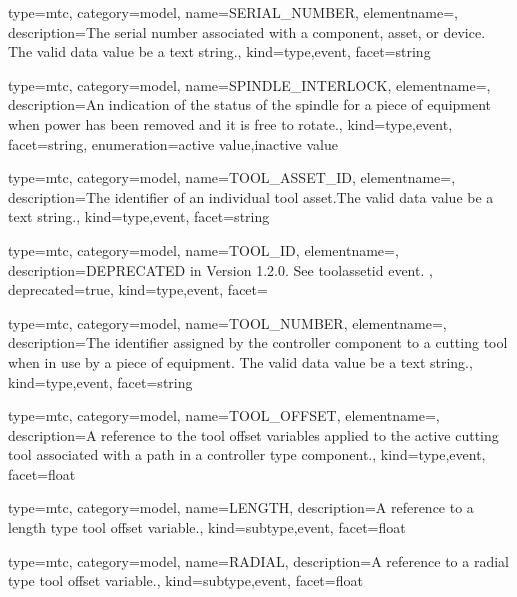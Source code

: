 {
  type=mtc,
  category=model,
  name={SERIAL\_NUMBER},
  elementname=,
  description={The serial number associated with a \gls{component}, \gls{asset}, or \gls{device}. The \gls{valid data value} \must be a text string.},
  kind={type,event},
  facet={\gls{string}}
}


{
  type=mtc,
  category=model,
  name={SPINDLE\_INTERLOCK},
  elementname=,
  description={An indication of the status of the spindle for a piece of equipment when power has been removed and it is free to rotate.},
  kind={type,event},
  facet={\gls{string}},
  enumeration={\gls{active value},\gls{inactive value}}
}


{
  type=mtc,
  category=model,
  name={TOOL\_ASSET\_ID},
  elementname=,
  description={The identifier of an individual tool asset.The \gls{valid data value} \must be a text string.},
  kind={type,event},
  facet={\gls{string}}
}


{
  type=mtc,
  category=model,
  name={TOOL\_ID},
  elementname=,
  description={DEPRECATED in Version 1.2.0.   See \gls{toolassetid event}. },
  deprecated={true},
  kind={type,event},
  facet={}
}


{
  type=mtc,
  category=model,
  name={TOOL\_NUMBER},
  elementname=,
  description={The identifier assigned by the \gls{controller} component to a cutting tool when in use by a piece of equipment. \newline The \gls{valid data value} \must be a text string.},
  kind={type,event},
  facet={\gls{string}}
}


{
  type=mtc,
  category=model,
  name={TOOL\_OFFSET},
  elementname=,
  description={A reference to the tool offset variables applied to the active cutting tool associated with a \gls{path} in a \gls{controller} type component.},
  kind={type,event},
  facet={\gls{float}}
}


{
  type=mtc,
  category=model,
  name={LENGTH},
  description={A reference to a length type tool offset variable.},
  kind={subtype,event},
  facet={\gls{float}}
}


{
  type=mtc,
  category=model,
  name={RADIAL},
  description={A reference to a radial type tool offset variable.},
  kind={subtype,event},
  facet={\gls{float}}
}


